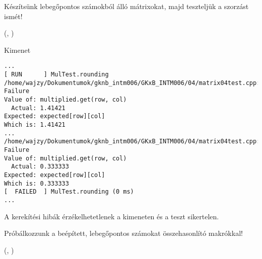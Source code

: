 \begin{frame}
  Készítsünk lebegőpontos számokból álló mátrixokat, majd teszteljük a szorzást ismét!
  \begin{exampleblock}{ %
    (, %
     )}
    \small
    
  \end{exampleblock}
\end{frame}

\begin{frame}
  \begin{exampleblock}{}
    \small
    
  \end{exampleblock}
\end{frame}

\begin{frame}[fragile]
  \begin{block}{Kimenet}
    \scriptsize
    \begin{verbatim}
...
[ RUN      ] MulTest.rounding
/home/wajzy/Dokumentumok/gknb_intm006/GKxB_INTM006/04/matrix04test.cpp:49: Failure
Value of: multiplied.get(row, col)
  Actual: 1.41421
Expected: expected[row][col]
Which is: 1.41421
...
/home/wajzy/Dokumentumok/gknb_intm006/GKxB_INTM006/04/matrix04test.cpp:49: Failure
Value of: multiplied.get(row, col)
  Actual: 0.333333
Expected: expected[row][col]
Which is: 0.333333
[  FAILED  ] MulTest.rounding (0 ms)
...
\end{verbatim}
  \end{block}
  A kerekítési hibák érzékelhetetlenek a kimeneten és a teszt sikertelen.
\end{frame}

\begin{frame}
  Próbálkozzunk a beépített, lebegőpontos számokat összehasonlító makrókkal!
  \begin{exampleblock}{ %
    (, %
     )}
    \footnotesize
    
  \end{exampleblock}
\end{frame}

